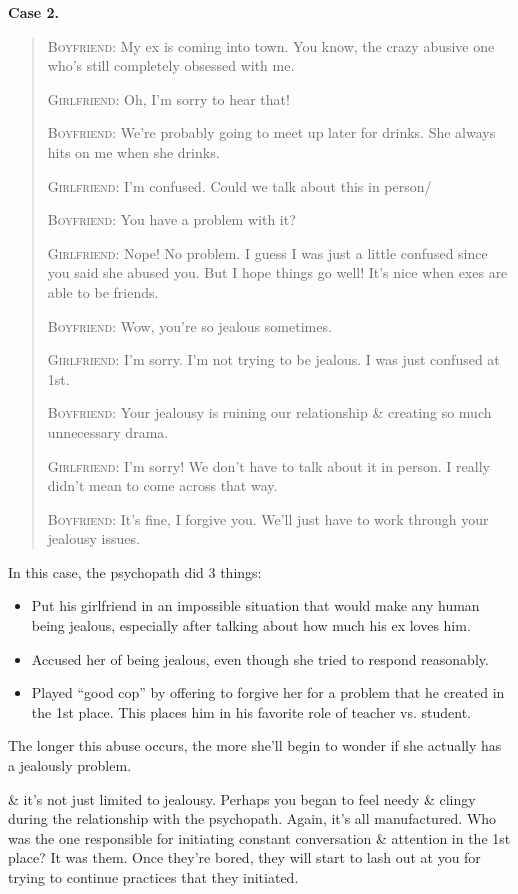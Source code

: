 \documentclass{article}
\numberwithin{equation}{section}
\begin{document}
\textbf{Case 2.}
\begin{quotation}
	\textsc{Boyfriend}: My ex is coming into town. You know, the crazy abusive one who's still completely obsessed with me.
	
	\textsc{Girlfriend}: Oh, I'm sorry to hear that!
	
	\textsc{Boyfriend}: We're probably going to meet up later for drinks. She always hits on me when she drinks.
	
	\textsc{Girlfriend}: I'm confused. Could we talk about this in person/
	
	\textsc{Boyfriend}: You have a problem with it?
	
	\textsc{Girlfriend}: Nope! No problem. I guess I was just a little confused since you said she abused you. But I hope things go well! It's nice when exes are able to be friends.
	
	\textsc{Boyfriend}: Wow, you're so jealous sometimes.
	
	\textsc{Girlfriend}: I'm sorry. I'm not trying to be jealous. I was just confused at 1st.
	
	\textsc{Boyfriend}: Your jealousy is ruining our relationship \& creating so much unnecessary drama.
	
	\textsc{Girlfriend}: I'm sorry! We don't have to talk about it in person. I really didn't mean to come across that way.
	
	\textsc{Boyfriend}: It's fine, I forgive you. We'll just have to work through your jealousy issues.
\end{quotation}
In this case, the psychopath did 3 things:
\begin{itemize}
	\item Put his girlfriend in an impossible situation that would make any human being jealous, especially after talking about how much his ex loves him.
	\item Accused her of being jealous, even though she tried to respond reasonably.
	\item Played ``good cop'' by offering to forgive her for a problem that he created in the 1st place. This places him in his favorite role of teacher vs. student.
\end{itemize}
The longer this abuse occurs, the more she'll begin to wonder if she actually has a jealously problem.

\& it's not just limited to jealousy. Perhaps you began to feel needy \& clingy during the relationship with the psychopath. Again, it's all manufactured. Who was the one responsible for initiating constant conversation \& attention in the 1st place? It was them. Once they're bored, they will start to lash out at you for trying to continue practices that they initiated.
\end{document}
